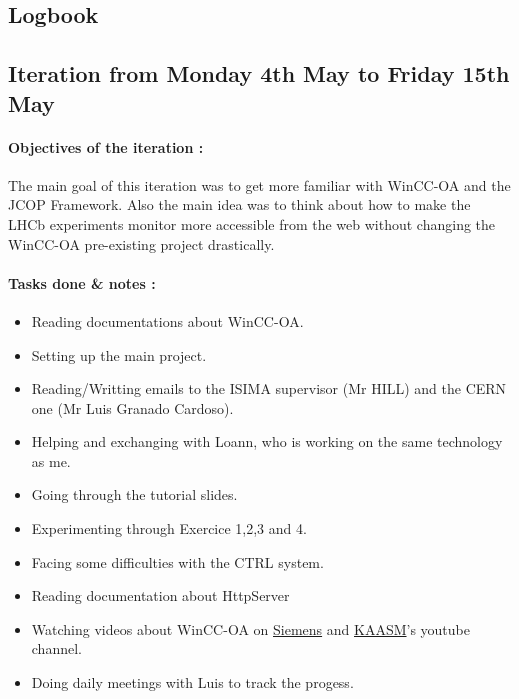 \documentclass[a4paper, 12pt]{article}
\begin{document}
\newpage
\appendixpage
\begin{appendix}
\section{Logbook}
\subsection{Iteration from Monday 4th May to Friday 15th May}
\paragraph{Objectives of the iteration :} 
The main goal of this iteration was to get more familiar with WinCC-OA and the JCOP Framework. 
Also the main idea was to think about how to make the LHCb experiments monitor more accessible from the web without changing the WinCC-OA pre-existing project drastically.
\paragraph{Tasks done \& notes :}
\begin{itemize}
    \item Reading documentations about WinCC-OA.
    \item Setting up the main project.
    \item Reading/Writting emails to the ISIMA supervisor (Mr HILL) and the CERN one (Mr Luis Granado Cardoso).
    \item Helping and exchanging with Loann, who is working on the same technology as me.
    \item Going through the tutorial slides.
    \item Experimenting through Exercice 1,2,3 and 4.
    \item Facing some difficulties with the CTRL system.
    \item Reading documentation about HttpServer
    \item Watching videos about WinCC-OA on \href{https://www.youtube.com/user/ETM2011}{Siemens} and \href{https://www.youtube.com/channel/UCGBnHd1-B-Zg9MDsjTk0-Sw}{KAASM}'s youtube channel. 
    \item Doing daily meetings with Luis to track the progess.
\end{itemize}


\end{appendix}
\end{document}

